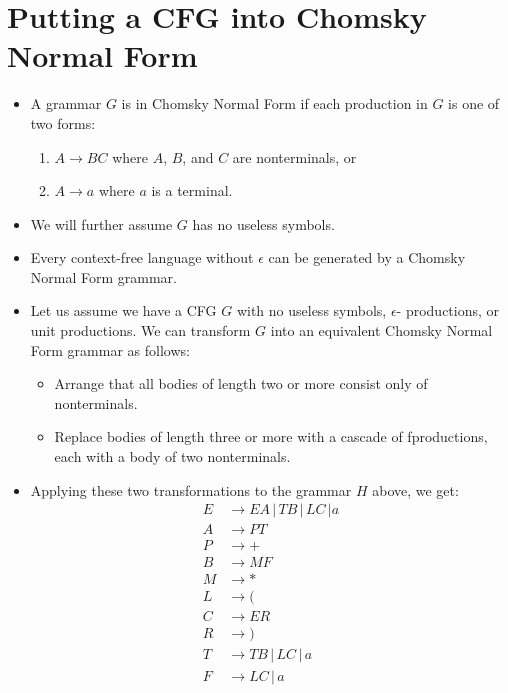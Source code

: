 \documentclass[]{article}
\begin{document}
\section{Putting a CFG into Chomsky Normal Form}
  \begin{itemize}
    \item A grammar $G$ is in Chomsky Normal Form if each production in $G$ is one 
    of two forms:
      \begin{enumerate}
        \item $A \rightarrow BC$ where $A$, $B$, and $C$ are nonterminals, or
        \item $A \rightarrow a$ where $a$ is a terminal.
      \end{enumerate}
    \item We will further assume $G$ has no useless symbols.
    \item Every context-free language without $\epsilon$ can be generated by a 
    Chomsky Normal Form grammar.
    \item Let us assume we have a CFG $G$ with no useless symbols, $\epsilon$-
    productions, or unit productions. We can transform $G$ into an equivalent 
    Chomsky Normal Form grammar as follows:
      \begin{itemize}
        \item Arrange that all bodies of length two or more consist only of 
        nonterminals.
        \item Replace bodies of length three or more with a cascade of 
        fproductions, each with a body of two nonterminals.
      \end{itemize}
    \item Applying these two transformations to the grammar $H$ above, we get:
      \begin{align*}
        E &\rightarrow EA \, | \, TB \, | \, LC \, | a \\
        A &\rightarrow PT                              \\
        P &\rightarrow +                               \\
        B &\rightarrow MF                              \\
        M &\rightarrow *                               \\
        L &\rightarrow (                               \\
        C &\rightarrow ER                              \\
        R &\rightarrow )                               \\
        T &\rightarrow TB \, | \, LC \, | \, a         \\
        F &\rightarrow LC \, | \, a                    \\
      \end{align*}
  \end{itemize}
  
\end{document}

